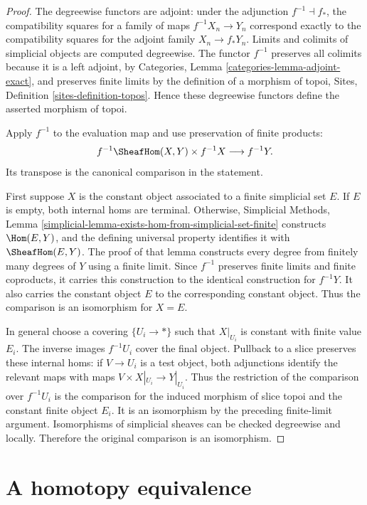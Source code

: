 \begin{proof}
The degreewise functors are adjoint: under the adjunction
$f^{-1} \dashv f_*$, the compatibility squares for a family of maps
$f^{-1}X_n \to Y_n$ correspond exactly to the compatibility squares for the
adjoint family $X_n \to f_*Y_n$.  Limits and colimits of simplicial objects
are computed degreewise.  The functor $f^{-1}$ preserves all colimits because
it is a left adjoint, by Categories, Lemma
\ref{categories-lemma-adjoint-exact}, and preserves finite limits by the
definition of a morphism of topoi, Sites, Definition
\ref{sites-definition-topos}.  Hence these degreewise functors define the
asserted morphism of topoi.

Apply $f^{-1}$ to the evaluation map and use preservation of finite products:
$$
f^{-1}\SheafHom(X,Y) \times f^{-1}X
\longrightarrow
f^{-1}Y.
$$
Its transpose is the canonical comparison in the statement.

First suppose $X$ is the constant object associated to a finite simplicial
set $E$.  If $E$ is empty, both internal homs are terminal.  Otherwise,
Simplicial Methods, Lemma
\ref{simplicial-lemma-exists-hom-from-simplicial-set-finite}
constructs $\Hom(E,Y)$, and the defining universal property identifies it
with $\SheafHom(E,Y)$.  The proof of that lemma constructs every degree from
finitely many degrees of $Y$ using a finite limit.  Since $f^{-1}$ preserves
finite limits and finite coproducts, it carries this construction to the
identical construction for $f^{-1}Y$.  It also carries the constant object
$E$ to the corresponding constant object.  Thus the comparison is an
isomorphism for $X=E$.

In general choose a covering $\{U_i \to *\}$ such that
$X|_{U_i}$ is constant with finite value $E_i$.  The inverse images
$f^{-1}U_i$ cover the final object.  Pullback to a slice preserves these
internal homs: if $V \to U_i$ is a test object, both adjunctions identify the
relevant maps with maps $V \times X|_{U_i} \to Y|_{U_i}$.  Thus the
restriction of the comparison over $f^{-1}U_i$ is the comparison for the
induced morphism of slice topoi and the constant finite object $E_i$.  It is
an isomorphism by the preceding finite-limit argument.  Isomorphisms of
simplicial sheaves can be checked degreewise and locally.  Therefore the
original comparison is an isomorphism.
\end{proof}

\section{A homotopy equivalence}
\label{section-homotopy-equivalence}

